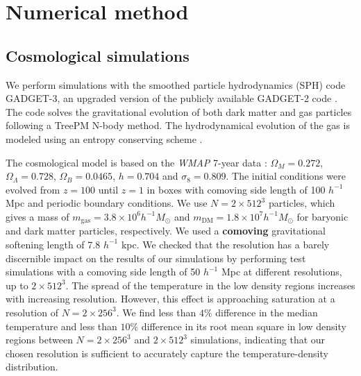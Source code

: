 \documentclass[numberedappendix]{emulateapj}
\newcommand\ALc[1]{{\color{red} \bf #1}} %
\begin{document}
\section{Numerical method}
\subsection{Cosmological simulations}
We perform simulations with the smoothed particle hydrodynamics (SPH) code \textsc{GADGET-3}, an upgraded version of the publicly available \textsc{GADGET-2} code \citep{2005MNRAS.364.1105S}. The code solves the gravitational evolution of both dark matter and gas particles following a TreePM N-body method. The hydrodynamical evolution of the gas is modeled using an entropy conserving scheme \citep{2002MNRAS.333..649S}.

The cosmological model is based on the \textit{WMAP} 7-year data \citep{2011ApJS..192...18K}: $\Omega_M=0.272$, $\Omega_{\Lambda}=0.728$, $\Omega_{B}= 0.0465$, $h=0.704$ and $\sigma_8=0.809$. The initial conditions were evolved from $z=100$ until $z=1$ in boxes with comoving side length of 100 $h^{-1}$ Mpc and periodic boundary conditions. We use $N= 2\times 512^3$ particles, which gives a mass of $m_\mathrm{gas}=3.8\times10^{6} h^{-1} M_{\odot}$ and $m_\mathrm{DM}=1.8\times 10^{7} h^{-1} M_{\odot}$ for baryonic and dark matter particles, respectively. We used a \ALc{comoving} gravitational softening length of 7.8 $h^{-1}$ kpc. We checked that the resolution has a barely discernible impact on the results of our simulations by performing test simulations with a comoving side length of 50 $h^{-1}$ Mpc at different resolutions, up to $2\times 512^3$. The spread of the temperature in the low density regions increases with increasing resolution. However, this effect is approaching saturation at a resolution of $N=2\times 256^3$. We find less than $4\%$ difference in the median temperature and less than $10\%$ difference in its root mean square in low density regions between $N=2\times 256^3$ and $2\times 512^3$ simulations, indicating that our chosen resolution is sufficient to accurately capture the temperature-density distribution. 
\end{document}
